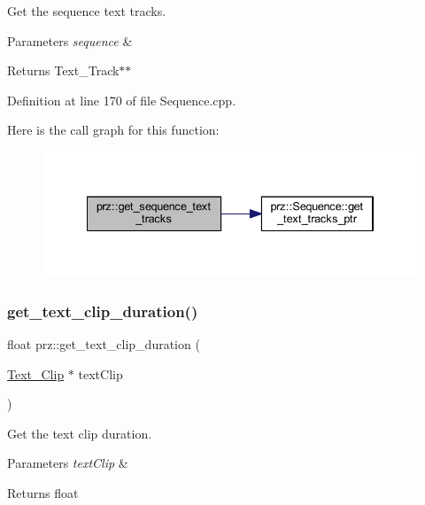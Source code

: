 Get the sequence text tracks. 


\begin{DoxyParams}{Parameters}
{\em sequence} & \\
\hline
\end{DoxyParams}
\begin{DoxyReturn}{Returns}
Text\+\_\+\+Track$\ast$$\ast$ 
\end{DoxyReturn}


Definition at line 170 of file Sequence.\+cpp.

Here is the call graph for this function\+:
\nopagebreak
\begin{figure}[H]
\begin{center}
\leavevmode
\includegraphics[width=334pt]{namespaceprz_a9f420e41b11dc1a0b8c5a22a9288ca46_cgraph}
\end{center}
\end{figure}
\mbox{\label{namespaceprz_af5b673ead16373948262d632b38d0343}} 
\subsubsection{\texorpdfstring{get\_text\_clip\_duration()}{get\_text\_clip\_duration()}}
{\footnotesize\ttfamily float prz\+::get\+\_\+text\+\_\+clip\+\_\+duration (\begin{DoxyParamCaption}\item[{\mbox{\hyperlink{classprz_1_1_text___clip}{Text\+\_\+\+Clip}} $\ast$}]{text\+Clip }\end{DoxyParamCaption})}



Get the text clip duration. 


\begin{DoxyParams}{Parameters}
{\em text\+Clip} & \\
\hline
\end{DoxyParams}
\begin{DoxyReturn}{Returns}
float 
\end{DoxyReturn}


